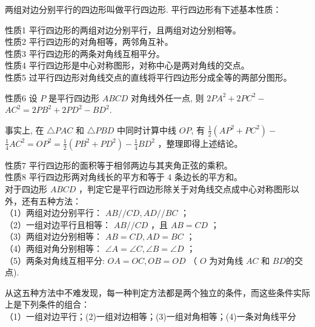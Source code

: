 \documentclass[10pt]{article}
\begin{document}
两组对边分别平行的四边形叫做平行四边形. 平行四边形有下述基本性质：

性质1 平行四边形的两组对边分别平行，且两组对边分别相等。\\
性质2 平行四边形的对角相等，两邻角互补。\\
性质3 平行四边形的两条对角线互相平分。\\
性质4 平行四边形是中心对称图形，对称中心是两对角线的交点。\\
性质5 过平行四边形对角线交点的直线将平行四边形分成全等的两部分图形。

性质6 设 $P$ 是平行四边形 $A B C D$ 对角线外任一点, 则 $2 P A^{2}+2 P C^{2}-$ $A C^{2}=2 P B^{2}+2 P D^{2}-B D^{2}$.

事实上, 在 $\triangle P A C$ 和 $\triangle P B D$ 中同时计算中线 $O P$, 有 $\frac{1}{2}\left(A P^{2}+P C^{2}\right)-$ $\frac{1}{4} A C^{2}=O P^{2}=\frac{1}{2}\left(P B^{2}+P D^{2}\right)-\frac{1}{4} B D^{2}$ ，整理即得上述结论。

性质7 平行四边形的面积等于相邻两边与其夹角正弦的乘积。\\
性质8 平行四边形两对角线长的平方和等于 4 条边长的平方和。\\
对于四边形 $A B C D$ ，判定它是平行四边形除关于对角线交点成中心对称图形以外，还有五种方法：\\
（1）两组对边分别平行： $A B / / C D, A D / / B C$ ；\\
（2）一组对边平行且相等： $A B / / C D$ ，且 $A B=C D$ ；\\
（3）两组对边分别相等： $A B=C D, A D=B C$ ；\\
（4）两组对角分别相等： $\angle A=\angle C, \angle B=\angle D$ ；\\
（5）两条对角线互相平分: $O A=O C, O B=O D$ （ $O$ 为对角线 $A C$ 和 $B D$的交点).

从这五种方法中不难发现，每一种判定方法都是两个独立的条件，而这些条件实际上是下列条件的组合：\\
（1）一组对边平行；(2)一组对边相等；(3)一组对角相等；(4)一条对角线平分
\end{document}
